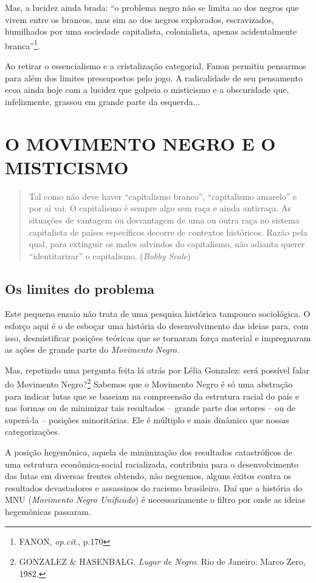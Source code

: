 Mas, a lucidez ainda brada: ``o problema negro não se limita ao dos
negros que vivem entre os brancos, mas sim ao dos negros explorados,
escravizados, humilhados por uma sociedade capitalista, colonialista,
apenas acidentalmente branca''\footnote{FANON, \emph{op.cit}., p.170}.

Ao retirar o essencialismo e a cristalização categorial, Fanon permitiu
pensarmos para além dos limites pressupostos pelo jogo. A radicalidade
de seu pensamento ecoa ainda hoje com a lucidez que golpeia o misticismo
e a obscuridade que, infelizmente, grassou em grande parte da
esquerda...

\part{O MOVIMENTO NEGRO E O MISTICISMO}

\begin{quote}
Tal como não deve haver ``capitalismo branco'', ``capitalismo amarelo''
e por aí vai. O capitalismo é sempre algo sem raça e ainda antirraça. As
situações de vantagem ou desvantagem de uma ou outra raça no sistema
capitalista de países específicos decorre de contextos históricos. Razão
pela qual, para extinguir os males advindos do capitalismo, não adianta
querer ``identitarizar'' o capitalismo. (\emph{Bobby Seale})
\end{quote}

\chapter{Os limites do problema}

Este pequeno ensaio não trata de uma pesquisa histórica tampouco
sociológica. O esforço aqui é o de esboçar uma história do
desenvolvimento das ideias para, com isso, desmistificar posições
teóricas que se tornaram força material e impregnaram as ações de grande
parte do \emph{Movimento Negro}.

Mas, repetindo uma pergunta feita lá atrás por Lélia Gonzalez: será
possível falar do Movimento Negro?\footnote{GONZALEZ \& HASENBALG.
  \emph{Lugar de Negro}. Rio de Janeiro: Marco Zero, 1982.} Sabemos que
o Movimento Negro é só uma abstração para indicar lutas que se baseiam
na compreensão da estrutura racial do país e nas formas ou de minimizar
tais resultados -- grande parte dos setores -- ou de superá-la --
posições minoritárias. Ele é múltiplo e mais dinâmico que nossas
categorizações.

A posição hegemônica, aquela de minimização dos resultados catastróficos
de uma estrutura econômica-social racializada, contribuiu para o
desenvolvimento das lutas em diversas frentes obtendo, não neguemos,
alguns êxitos contra os resultados devastadores e assassinos do racismo
brasileiro. Daí que a história do MNU (\emph{Movimento Negro Unificado})
é necessariamente o filtro por onde as ideias hegemônicas passaram.

